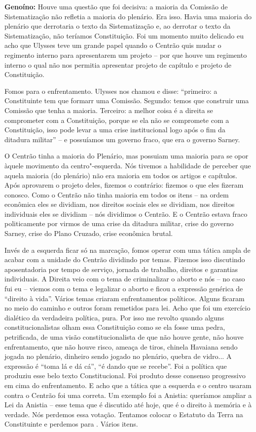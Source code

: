 \textbf{Genoíno:} Houve uma questão que foi decisiva: a maioria da
Comissão de Sistematização não refletia a maioria do plenário. Era isso.
Havia uma maioria do plenário que derrotaria o texto da Sistematização
e, ao derrotar o texto da Sistematização, não teríamos Constituição. Foi
um momento muito delicado eu acho que Ulysses teve um grande papel
quando o Centrão quis mudar o regimento interno para apresentarem um
projeto -- por que houve um regimento interno o qual não nos permitia
apresentar projeto de capítulo e projeto de Constituição.

Fomos para o enfrentamento. Ulysses nos chamou e disse: ``primeiro: a
Constituinte tem que formarr uma Comissão. Segundo: temos que construir
uma Comissão que tenha a maioria. Terceiro: a melhor coisa é a direita
se comprometer com a Constituição, porque se ela não se compromete com a
Constituição, isso pode levar a uma crise institucional logo após o fim
da ditadura militar'' -- e possuíamos um governo fraco, que era o
governo Sarney.

O Centrão tinha a maioria do Plenário, mas possuiam uma maioria para se
opor àquele movimento da centro"-esquerda. Nós tivemos a habilidade de
perceber que aquela maioria (do plenário) não era maioria em todos os
artigos e capítulos. Após aprovarem o projeto deles, fizemos o
contrário: fizemos o que eles fizeram conosco. Como o Centrão não tinha
maioria em todos os itens -- na ordem econômica eles se dividiam, nos
direitos sociais eles se dividiam, nos direitos individuais eles se
dividiam -- nós dividimos o Centrão. E o Centrão estava fraco
politicamente por virmos de uma crise da ditadura militar, crise do
governo Sarney, crise do Plano Cruzado, crise econômica brutal.

Invés de a esquerda ficar só na marcação, fomos operar com uma tática
ampla de acabar com a unidade do Centrão dividindo por temas. Fizemos
isso discutindo aposentadoria por tempo de serviço, jornada de trabalho,
direitos e garantias individuais. A Direita veio com o tema de
criminalizar o aborto e nós -- no caso fui eu -- viemos com o tema e
legalizar o aborto e ficou a expressão genérica de ``direito à vida''.
Vários temas criaram enfrentamentos políticos. Alguns ficaram no meio do
caminho e outros foram remetidos para lei. Acho que foi um exercício
dialético da verdadeira política, pura. Por isso me revolto quando
alguns constitucionalistas olham essa Constituição como se ela fosse uma
pedra, petrificada, de uma visão constitucionalista de que não houve
gente, não houve enfrentamento, que não houve risco, ameaça de tiros,
chinela Havaiana sendo jogada no plenário, dinheiro sendo jogado no
plenário, quebra de vidro... A expressão é ``toma lá e dá cá'', ``é
dando que se recebe''. Foi a política que produziu esse belo texto
Constitucional. Foi produto desse consenso progressivo em cima do
enfrentamento. E acho que a tática que a esquerda e o centro usaram
contra o Centrão foi uma correta. Um exemplo foi a Anistia: queríamos
ampliar a Lei da Anistia -- esse tema que é discutido até hoje, que é o
direito à memória e à verdade. Nós perdemos essa votação. Tentamos
colocar o Estatuto da Terra na Constituinte e perdemos para . Vários
itens.

